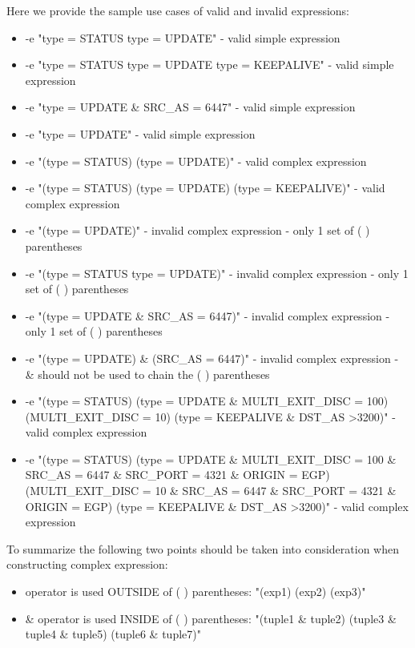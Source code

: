 \documentclass[11pt]{article} %
\begin{document}
Here we provide the sample use cases of valid and invalid expressions:
\begin{itemize}

\item{-e "type = STATUS \textbar \space type = UPDATE" - valid simple expression}
\item{-e "type = STATUS \textbar \space type = UPDATE \textbar \space type = KEEPALIVE" - valid simple expression}
\item{-e "type = UPDATE \& SRC\_AS = 6447" - valid simple expression}
\item{-e "type = UPDATE" - valid simple expression}


\item{-e "(type = STATUS) \textbar \space (type = UPDATE)" - valid complex expression}
\item{-e "(type = STATUS) \textbar \space (type = UPDATE) \textbar \space (type = KEEPALIVE)" - valid complex expression} 
\item{-e "(type = UPDATE)" - invalid complex expression - only 1 set of ( ) parentheses}
\item{-e "(type = STATUS \textbar \space type = UPDATE)" - invalid complex expression - only 1 set of ( ) parentheses}
\item{-e "(type = UPDATE \& SRC\_AS = 6447)" - invalid complex expression - only 1 set of ( ) parentheses}

\item{-e "(type = UPDATE) \& (SRC\_AS = 6447)" - invalid complex expression - \& should not be used to chain the ( ) parentheses}

\item{-e "(type = STATUS) \textbar \space (type = UPDATE \& MULTI\_EXIT\_DISC = 100) \textbar \space (MULTI\_EXIT\_DISC = 10) \textbar \space (type = KEEPALIVE \& DST\_AS \textgreater 3200)" - valid complex expression}
\item{-e "(type = STATUS) \textbar \space (type = UPDATE \& MULTI\_EXIT\_DISC = 100 \& SRC\_AS = 6447 \& SRC\_PORT = 4321 \& ORIGIN = EGP) \textbar \space (MULTI\_EXIT\_DISC = 10 \& SRC\_AS = 6447 \& SRC\_PORT = 4321 \& ORIGIN = EGP) \textbar \space (type = KEEPALIVE \& DST\_AS \textgreater 3200)" - valid complex expression}

\end{itemize}

To summarize the following two points should be taken into consideration when constructing complex expression:
\begin{itemize}

\item{\textbar \space operator is used OUTSIDE of ( ) parentheses: "(exp1) \textbar \space (exp2) \textbar \space (exp3)"}
\item{\& operator is used INSIDE of ( ) parentheses: "(tuple1 \& tuple2) \textbar \space (tuple3 \& tuple4 \& tuple5) \textbar \space (tuple6 \& tuple7)"}

\end{itemize}
\end{document}
